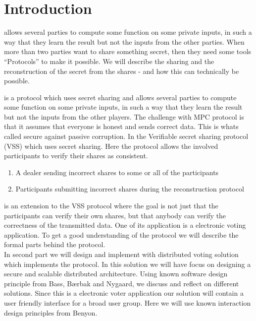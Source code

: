 \section{Introduction}

 allows several parties to compute some function on some private inputs, in such a way that they learn the result but not the inputs from the other parties. When more than two parties want to share something secret, then they need some tools “Protocols” to make it possible. We will describe the sharing and the reconstruction of the secret from the shares - and how this can technically be possible. 

 is a protocol which uses secret sharing and allows several parties to compute some function on some private inputs, in such a way that they learn the result but not the inputs from the other players.  The challenge with MPC protocol is that it assumes that everyone is honest and sends correct data. This is whats called secure against passive corruption. In the Verifiable secret sharing protocol (VSS) which uses secret sharing. Here the protocol allows the involved participants to verify their shares as consistent.   \\


\begin{infobox}
\begin{enumerate}
\item A dealer sending incorrect shares to some or all of the participants
\item Participants submitting incorrect shares during the reconstruction protocol
\end{enumerate}
\end{infobox}

 is an extension to the VSS protocol where the goal is not just that the participants can verify their own shares, but that anybody can verify the correctness of the transmitted data. One of its application is a electronic voting application. To get a good understanding of the protocol we will describe the formal parts behind the protocol. \\

 In second part we will design and implement with distributed voting solution which implements the protocol. In this solution we will have focus on designing a secure and scalable distributed architecture. Using known software design principle from Bass, Bærbak and Nygaard, we discuss and reflect on different solutions. Since this is a electronic voter application our solution will contain a user friendly interface for a broad user group. Here we will use known interaction design principles from Benyon.

